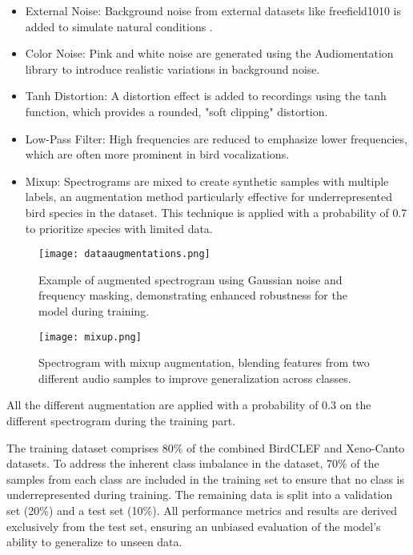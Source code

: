\begin{itemize}
    \item External Noise: Background noise from external datasets like freefield1010 is added to simulate natural conditions \cite{stowell2013open}.
    \item Color Noise: Pink and white noise are generated using the Audiomentation library to introduce realistic variations in background noise.
    \item Tanh Distortion: A distortion effect is added to recordings using the tanh function, which provides a rounded, "soft clipping" distortion.
    \item Low-Pass Filter: High frequencies are reduced to emphasize lower frequencies, which are often more prominent in bird vocalizations.
    \item Mixup: Spectrograms are mixed to create synthetic samples with multiple labels, an augmentation method particularly effective for underrepresented bird species in the dataset. This technique is applied with a probability of 0.7 to prioritize species with limited data\cite{zhang2017mixup}.
\end{itemize}

\begin{figure}[h]
    \centering
    \texttt{[image: dataaugmentations.png]}
    \caption{Example of augmented spectrogram using Gaussian noise and frequency masking, demonstrating enhanced robustness for the model during training.
    }
    \vspace{0.1cm}
    \label{fig:augmentation1}
\end{figure}
\begin{figure}[h]
    \centering
    \texttt{[image: mixup.png]}
    \caption{Spectrogram with mixup augmentation, blending features from two different audio samples to improve generalization across classes.}
    \vspace{0.1cm}
    \label{fig:augmentation2}
\end{figure}

All the different augmentation are applied with a probability of 0.3 on the different spectrogram during the training part.

The training dataset comprises 80\% of the combined BirdCLEF and Xeno-Canto datasets. To address the inherent class imbalance in the dataset, 70\% of the samples from each class are included in the training set to ensure that no class is underrepresented during training. The remaining data is split into a validation set (20\%) and a test set (10\%). All performance metrics and results are derived exclusively from the test set, ensuring an unbiased evaluation of the model’s ability to generalize to unseen data.

